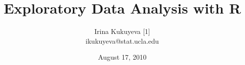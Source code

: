 \title{Exploratory Data Analysis with \ttfamily R \normalfont}
\author{Irina Kukuyeva [1] \\ \ttfamily ikukuyeva@stat.ucla.edu \normalfont}
\date{August 17, 2010}


\frame{ \titlepage }
